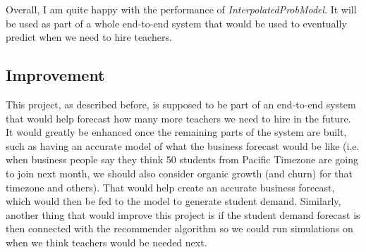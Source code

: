 \documentclass[oneside]{article}
\begin{document}
Overall, I am quite happy with the performance of \emph{InterpolatedProbModel}.
It will be used as part of a whole end-to-end system that would be used to
eventually predict when we need to hire teachers.

\subsection{Improvement}

This project, as described before, is supposed to be part of an end-to-end
system that would help forecast how many more teachers we need to hire in the
future. It would greatly be enhanced once the remaining parts of the system are
built, such as having an accurate model of what the business forecast would be
like (i.e. when business people say they think 50 students from Pacific
Timezone are going to join next month, we should also consider organic growth
(and churn) for that timezone and others). That would help create an accurate
business forecast, which would then be fed to the model to generate student
demand. Similarly, another thing that would improve this project is if the
student demand forecast is then connected with the recommender algorithm so we
could run simulations on when we think teachers would be needed next.




\end{document}

